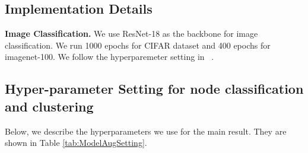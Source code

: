 \subsection{Implementation Details\label{sec:impl}}
\vspace{0.1cm}
\noindent \textbf{Image Classification.}
We use ResNet-18 as the backbone for image classification. We run 1000 epochs for CIFAR dataset and 400 epochs for imagenet-100. We follow the hyperparemeter setting in ~.

\vspace{0.1cm}
\subsection{Hyper-parameter Setting for node classification and clustering}
\label{app:hyperparam}
Below, we describe the hyperparameters we use for the main result. They are shown in Table \ref{tab:ModelAugSetting}.
\begin{table}[h]
\centering
{}
\caption{The hyperparameters used for reproducing our results.}
\label{tab:ModelAugSetting}
\end{table}
